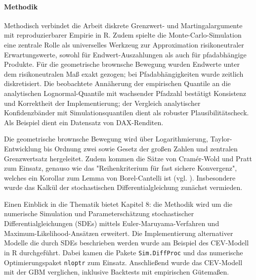 \paragraph{Methodik}
Methodisch verbindet die Arbeit diskrete Grenzwert- und Martingalargumente mit 
reproduzierbarer Empirie in R. Zudem spielte die Monte-Carlo-Simulation eine zentrale Rolle als universelles Werkzeug zur Approximation risikoneutraler Erwartungswerte, sowohl für Endwert-Auszahlungen als auch für pfadabhängige Produkte. Für die geometrische brownsche Bewegung wurden Endwerte unter dem risikoneutralen Maß exakt gezogen; bei Pfadabhängigkeiten wurde zeitlich diskretisiert. Die beobachtete Annäherung der empirischen Quantile an die analytischen Lognormal-Quantile mit wachsender Pfadzahl bestätigt Konsistenz und Korrektheit der Implementierung; der Vergleich analytischer Konfidenzbänder mit Simulationsquantilen dient als robuster Plausibilitätscheck.
Als Beispiel dient ein Datensatz von DAX-Renditen.

Die geometrische brownsche Bewegung wird über Logarithmierung, Taylor-Entwicklung bis Ordnung zwei sowie Gesetz der großen Zahlen und 
zentralen Grenzwertsatz hergeleitet. Zudem kommen die Sätze von Cramér-Wold und Pratt zum Einsatz, 
genauso wie das "Reihenkriterium für fast sichere Konvergenz", welches 
ein Korollar zum Lemma von Borel-Cantelli ist (vgl. \cite{henze}). Insbesondere wurde das Kalkül der stochastischen Differentialgleichung zunächst vermieden.

Einen Einblick in die Thematik bietet Kapitel 8: die Methodik wird um die numerische Simulation und Parameterschätzung stochastischer Differentialgleichungen (SDEs) mittels Euler-Maruyama-Verfahren und Maximum-Likelihood-Ansätzen erweitert. 
Die Implementierung alternativer Modelle die durch SDEs beschrieben werden wurde am Beispiel des CEV-Modell in R durchgeführt.
Dabei kamen die Pakete \texttt{Sim.DiffProc} und das numerische Optimierungspaket \texttt{nloptr} zum Einsatz.
Anschließend wurde das CEV-Modell mit der GBM verglichen, inklusive Backtests mit empirischen Gütemaßen.

